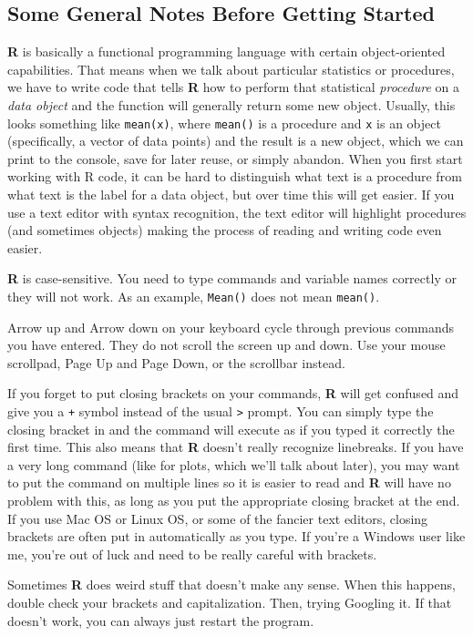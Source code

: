 \documentclass[12pt]{article}\usepackage[]{graphicx}\usepackage[]{color}
\begin{document}
\subsection{Some General Notes Before Getting Started}
\begin{itemize*}
\item \textbf{R} is basically a functional programming language with certain object-oriented capabilities. That means when we talk about particular statistics or procedures, we have to write code that tells \textbf{R} how to perform that statistical \emph{procedure} on a \emph{data object} and the function will generally return some new object. Usually, this looks something like \verb|mean(x)|, where \verb|mean()| is a procedure and \verb|x| is an object (specifically, a vector of data points) and the result is a new object, which we can print to the console, save for later reuse, or simply abandon. When you first start working with R code, it can be hard to distinguish what text is a procedure from what text is the label for a data object, but over time this will get easier. If you use a text editor with syntax recognition, the text editor will highlight procedures (and sometimes objects) making the process of reading and writing code even easier.
\item \textbf{R} is case-sensitive. You need to type commands and variable names correctly or they will not work. As an example, \verb|Mean()| does not mean \verb|mean()|.
\item Arrow up and Arrow down on your keyboard cycle through previous commands you have entered. They do not scroll the screen up and down. Use your mouse scrollpad, Page Up and Page Down, or the scrollbar instead.
\item If you forget to put closing brackets on your commands, \textbf{R} will get confused and give you a \verb|+| symbol instead of the usual \verb|>| prompt. You can simply type the closing bracket in and the command will execute as if you typed it correctly the first time. This also means that \textbf{R} doesn't really recognize linebreaks. If you have a very long command (like for plots, which we'll talk about later), you may want to put the command on multiple lines so it is easier to read and \textbf{R} will have no problem with this, as long as you put the appropriate closing bracket at the end. If you use Mac OS or Linux OS, or some of the fancier text editors, closing brackets are often put in automatically as you type. If you're a Windows user like me, you're out of luck and need to be really careful with brackets.
\item Sometimes \textbf{R} does weird stuff that doesn't make any sense. When this happens, double check your brackets and capitalization. Then, trying Googling it. If that doesn't work, you can always just restart the program.
\end{itemize*}
\end{document}
